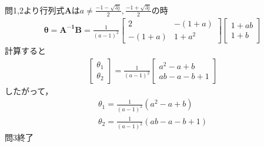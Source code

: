 \documentclass[uplatex,b5j]{jsarticle} %
\begin{document}
\section{}
問1,2より行列式$\boldsymbol{A}$は$a\neq\frac{-1-\sqrt{3\mathrm{j}}}{2}, \frac{-1+\sqrt{3\mathrm{j}}}{2}$の時
\begin{eqnarray} \label{eq:12}
    \boldsymbol{\theta}=\boldsymbol{A^{-1}\boldsymbol{B}}
    =\frac{1}{(a-1)^{2}}\left[
        \begin{array}{cc}
            2 & -(1+a) \\
            -(1+a) & 1+a^{2}
        \end{array}
    \right]\left[
        \begin{array}{c}
            1 + ab \\
            1 + b
        \end{array}
    \right]
\end{eqnarray}
計算すると
\begin{eqnarray} \label{eq:13}
    \left[
        \begin{array}{c}
            \theta_1 \\
            \theta_2
        \end{array}
    \right]
    =\frac{1}{(a-1)^{2}}\left[
        \begin{array}{c}
            a^{2} - a + b \\
            ab - a - b + 1
        \end{array}
    \right]
\end{eqnarray}
したがって，
\begin{eqnarray}
    \theta_1 = \frac{1}{(a-1)^{2}}(a^{2}-a+b) \\  \label{eq:14}
    \theta_2 = \frac{1}{(a-1)^{2}}(ab-a-b+1)  \label{eq:15}
\end{eqnarray}
問3終了
\end{document}

